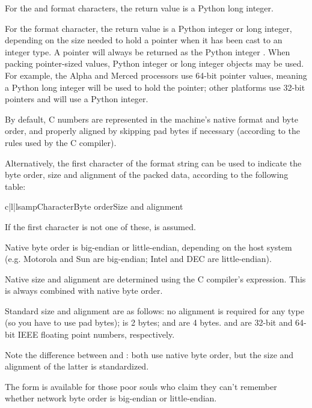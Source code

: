 For the  and  format characters, the return
value is a Python long integer.

For the  format character, the return value is a Python
integer or long integer, depending on the size needed to hold a
pointer when it has been cast to an integer type.  A \NULL{} pointer will
always be returned as the Python integer . When packing pointer-sized
values, Python integer or long integer objects may be used.  For
example, the Alpha and Merced processors use 64-bit pointer values,
meaning a Python long integer will be used to hold the pointer; other
platforms use 32-bit pointers and will use a Python integer.

By default, C numbers are represented in the machine's native format
and byte order, and properly aligned by skipping pad bytes if
necessary (according to the rules used by the C compiler).

Alternatively, the first character of the format string can be used to
indicate the byte order, size and alignment of the packed data,
according to the following table:

\begin{tableiii}{c|l|l}{samp}{Character}{Byte order}{Size and alignment}
\end{tableiii}

If the first character is not one of these,  is assumed.

Native byte order is big-endian or little-endian, depending on the
host system (e.g. Motorola and Sun are big-endian; Intel and DEC are
little-endian).

Native size and alignment are determined using the C compiler's
 expression.  This is always combined with native byte
order.

Standard size and alignment are as follows: no alignment is required
for any type (so you have to use pad bytes);  is 2 bytes;
 and  are 4 bytes.   and
 are 32-bit and 64-bit IEEE floating point numbers,
respectively.

Note the difference between  and \character{=}: both use
native byte order, but the size and alignment of the latter is
standardized.

The form \character{!} is available for those poor souls who claim they
can't remember whether network byte order is big-endian or
little-endian.

